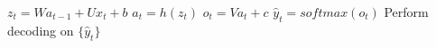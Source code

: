 \documentclass{article}
\newcommand{\diag}[1]{diag({#1})}
\newcommand{\reshape}[2]{reshape \left({#1},\ {#2}\right)}
\newcommand{\bm}[1]{\textbf{#1}}
\newcommand{\der}[2]{\frac{\partial #1}{\partial #2}}
\begin{document}
\begin{algorithm}
\begin{algorithmic}
    \end{algorithmic}
\end{algorithm}

\begin{algorithm}
    \begin{algorithmic}
        \State $z_t = W a_{t-1} + U x_t + b$ 
        \State $a_t = h(z_t)$
        \State $o_t = V a_t + c$
        \State $\hat{y}_t = softmax(o_t)$
        \EndFor
        \State Perform decoding on $\{\hat{y}_t\}$ 
        \EndFunction
    \end{algorithmic}
\end{algorithm}
\end{document}
